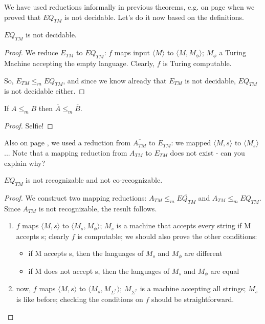 We have used reductions informally in previous theorems, e.g. on page
\pageref{reduction1} when we proved that $EQ_{TM}$ is not decidable.
Let's do it now based on the definitions.

\begin{theorem}
$EQ_{TM}$ is not decidable.
\end{theorem}
\begin{proof}
We reduce $E_{TM}$ to $EQ_{TM}$: $f$ maps input $\langle M \rangle$ to
$\langle M,M_\phi \rangle$; $M_\phi$ a Turing Machine accepting the
empty language. Clearly, $f$ is Turing computable.

So, $E_{TM} \leq_m EQ_{TM}$, and since we know already that $E_{TM}$
is not decidable, $EQ_{TM}$ is not decidable either.
\end{proof}

\begin{theorem}
If $A \leq_m B$ then  $\overline{A} \leq_m \overline{B}$.
\end{theorem}
\begin{proof}
Selfie!
\end{proof}


Also on page \pageref{nonreductie1}, we used a reduction from
$\overline{A_{TM}}$ to $E_{TM}$: we mapped $\langle M,s \rangle$ to
$\langle M_s \rangle$ ...  Note that a mapping reduction from
$A_{TM}$ to $E_{TM}$ does not exist - can you explain why?

\begin{theorem}
$EQ_{TM}$ is not recognizable and not co-recognizable.
\end{theorem}
\begin{proof}
We construct two mapping reductions: $A_{TM} \leq_m
\overline{EQ_{TM}}$ and $A_{TM} \leq_m EQ_{TM}$. Since
$\overline{A_{TM}}$ is not recognizable, the result follows.
\begin{enumerate}
\item $f$ maps $\langle M,s \rangle$ to $\langle M_s,M_\phi \rangle$;
  $M_s$ is a machine that accepts every string if M accepts s; clearly
  $f$ is computable; we should also prove the other conditions:
\begin{itemize}
\item if M accepts s, then the languages of $M_s$ and $M_\phi$ are
  different
\item if M does not accept s, then the languages of $M_s$ and $M_\phi$
  are equal
\end{itemize}

\item now, $f$ maps $\langle M,s \rangle$ to $\langle M_s,M_{\Sigma^*}
  \rangle$; $M_{\Sigma^*}$ is a machine accepting all strings; $M_s$
  is like before; checking the conditions on $f$ should be
straightforward.
\end{enumerate}
\end{proof}



